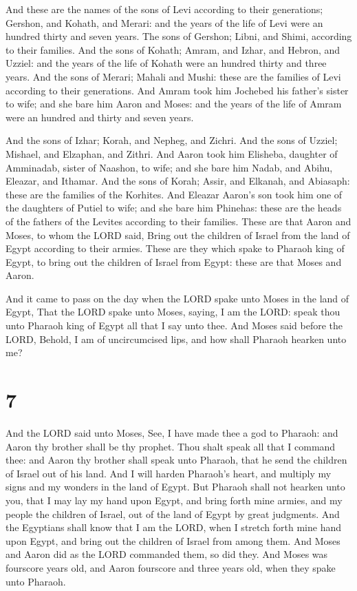  And these are the names of the sons of Levi according to
their generations; Gershon, and Kohath, and Merari: and the years of the
life of Levi were an hundred thirty and seven years.  The
sons of Gershon; Libni, and Shimi, according to their families.
 And the sons of Kohath; Amram, and Izhar, and Hebron,
and Uzziel: and the years of the life of Kohath were an hundred thirty
and three years.  And the sons of Merari; Mahali and
Mushi: these are the families of Levi according to their generations.
 And Amram took him Jochebed his father's sister to wife;
and she bare him Aaron and Moses: and the years of the life of Amram
were an hundred and thirty and seven years.

 And the sons of Izhar; Korah, and Nepheg, and Zichri.
 And the sons of Uzziel; Mishael, and Elzaphan, and
Zithri.  And Aaron took him Elisheba, daughter of
Amminadab, sister of Naashon, to wife; and she bare him Nadab, and
Abihu, Eleazar, and Ithamar.  And the sons of Korah;
Assir, and Elkanah, and Abiasaph: these are the families of the
Korhites.  And Eleazar Aaron's son took him one of the
daughters of Putiel to wife; and she bare him Phinehas: these are the
heads of the fathers of the Levites according to their families.
 These are that Aaron and Moses, to whom the LORD said,
Bring out the children of Israel from the land of Egypt according to
their armies.  These are they which spake to Pharaoh king
of Egypt, to bring out the children of Israel from Egypt: these are that
Moses and Aaron.

 And it came to pass on the day when the LORD spake unto
Moses in the land of Egypt,  That the LORD spake unto
Moses, saying, I am the LORD: speak thou unto Pharaoh king of Egypt all
that I say unto thee.  And Moses said before the LORD,
Behold, I am of uncircumcised lips, and how shall Pharaoh hearken unto
me?

\hypertarget{section-6}{%
\section{7}\label{section-6}}

 And the LORD said unto Moses, See, I have made thee a god
to Pharaoh: and Aaron thy brother shall be thy prophet. 
Thou shalt speak all that I command thee: and Aaron thy brother shall
speak unto Pharaoh, that he send the children of Israel out of his land.
 And I will harden Pharaoh's heart, and multiply my signs
and my wonders in the land of Egypt.  But Pharaoh shall
not hearken unto you, that I may lay my hand upon Egypt, and bring forth
mine armies, and my people the children of Israel, out of the land of
Egypt by great judgments.  And the Egyptians shall know
that I am the LORD, when I stretch forth mine hand upon Egypt, and bring
out the children of Israel from among them.  And Moses and
Aaron did as the LORD commanded them, so did they.  And
Moses was fourscore years old, and Aaron fourscore and three years old,
when they spake unto Pharaoh.

